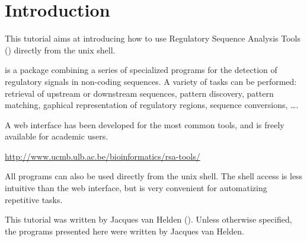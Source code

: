 
\section{Introduction}

This tutorial aims at introducing how to use Regulatory Sequence
Analysis Tools (\RSAT) directly from the unix shell.

\RSAT is a package combining a series of specialized programs for the
detection of regulatory signals in non-coding sequences. A variety of
tasks can be performed: retrieval of upstream or downstream sequences,
pattern discovery, pattern matching, gaphical representation of
regulatory regions, sequence conversions, \ldots.

A web interface has been developed for the most common tools, and is
freely available for academic users.

\url{http://www.ucmb.ulb.ac.be/bioinformatics/rsa-tools/}

All programs can also be used directly from the unix shell. The shell
access is less intuitive than the web interface, but is very
convenient for automatizing repetitive tasks.

This tutorial was written by Jacques van Helden
().  Unless otherwise specified, the
programs presented here were written by Jacques van Helden.
